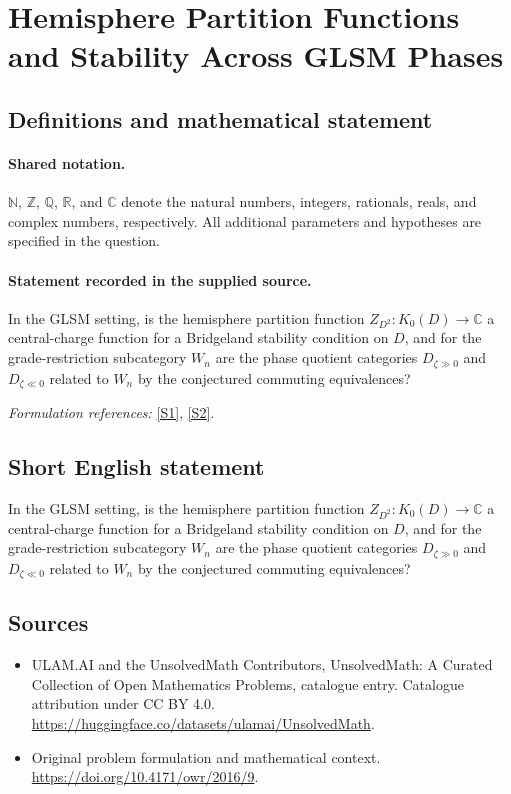 \documentclass[11pt]{article}
\newcommand{\sref}[2]{\hyperlink{source:#1:#2}{[S#2]}}
\begin{document}
\section{Hemisphere Partition Functions and Stability Across GLSM Phases}\label{statement}

\subsection{Definitions and mathematical statement}

\paragraph{Shared notation.}$\mathbb N$, $\mathbb Z$, $\mathbb Q$, $\mathbb R$, and $\mathbb C$ denote the natural numbers, integers, rationals, reals, and complex numbers, respectively. All additional parameters and hypotheses are specified in the question.


\paragraph{Statement recorded in the supplied source.}
In the GLSM setting, is the hemisphere partition function $Z_{D^2}:K_0(D)\to\mathbb C$ a central-charge function for a Bridgeland stability condition on $D$, and for the grade-restriction subcategory $W_n$ are the phase quotient categories $D_{\zeta\gg0}$ and $D_{\zeta\ll0}$ related to $W_n$ by the conjectured commuting equivalences?
\par\smallskip\textit{Formulation references:} \sref{statement}{1}, \sref{statement}{2}.
\subsection{Short English statement}
In the GLSM setting, is the hemisphere partition function $Z_{D^2}:K_0(D)\to\mathbb C$ a central-charge function for a Bridgeland stability condition on $D$, and for the grade-restriction subcategory $W_n$ are the phase quotient categories $D_{\zeta\gg0}$ and $D_{\zeta\ll0}$ related to $W_n$ by the conjectured commuting equivalences?
\subsection{Sources}
\begin{itemize}
\item[\hypertarget{source:statement:1}{S1}] ULAM.AI and the UnsolvedMath Contributors, UnsolvedMath: A Curated Collection of Open Mathematics Problems, catalogue entry. Catalogue attribution under CC BY 4.0.
\url{https://huggingface.co/datasets/ulamai/UnsolvedMath}.
\item[\hypertarget{source:statement:2}{S2}] Original problem formulation and mathematical context.
\url{https://doi.org/10.4171/owr/2016/9}.
\end{itemize}
\label{end:statement}
\end{document}
